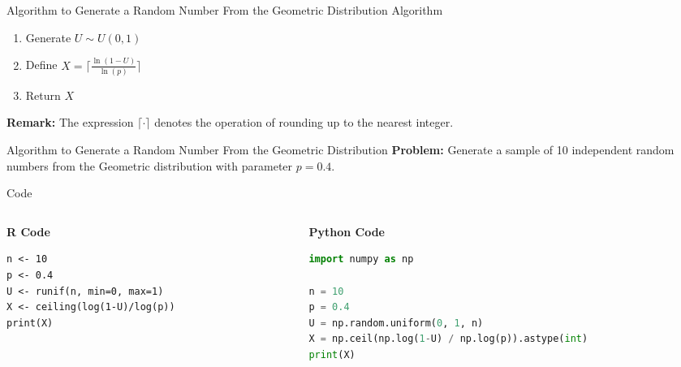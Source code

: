 \documentclass[8pt]{beamer}
\begin{document}
\begin{frame}{Algorithm to Generate a Random Number From the Geometric Distribution}
\alert{Algorithm}

\vspace{2mm}

\begin{enumerate}
\item Generate $U\sim U(0,1)$
\item Define $\displaystyle{X=\Bigg\lceil \frac{\ln(1-U)}{\ln (p)} \Bigg\rceil}$
\item Return $X$
\end{enumerate}

\textbf{Remark:} The expression $\lceil \cdot \rceil$ denotes the operation of rounding up to the nearest integer.
\end{frame}

\begin{frame}[fragile]{Algorithm to Generate a Random Number From the Geometric Distribution}
\textbf{Problem:} Generate a sample of 10 independent random numbers from the Geometric distribution with parameter $p=0.4$.

\vspace{2mm}

\alert{Code}

\begin{columns}[T]
\begin{column}{0.4\textwidth}
\textbf{R Code}
\begin{lstlisting}
n <- 10
p <- 0.4
U <- runif(n, min=0, max=1)
X <- ceiling(log(1-U)/log(p))
print(X)
\end{lstlisting}
\end{column}

\begin{column}{0.5\textwidth}
\textbf{Python Code}
\begin{lstlisting}[language=Python]
import numpy as np

n = 10
p = 0.4
U = np.random.uniform(0, 1, n)
X = np.ceil(np.log(1-U) / np.log(p)).astype(int)
print(X)
\end{lstlisting}
\end{column}
\end{columns}
\end{frame}
\end{document}
